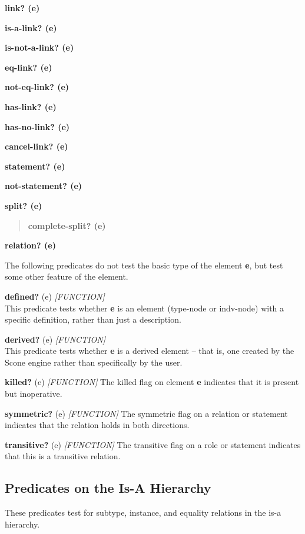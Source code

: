 \documentclass[titlepage,twoside,openright,11pt]{article}
\begin{document}
\textbf{link? (e)}

\textbf{is-a-link? (e)}

\textbf{is-not-a-link? (e)}

\textbf{eq-link? (e)}

\textbf{not-eq-link? (e)}

\textbf{has-link? (e)}

\textbf{has-no-link? (e)}

\textbf{cancel-link? (e)}

\textbf{statement? (e)}

\textbf{not-statement? (e)}

\textbf{split? (e)}

\begin{quote}
\textbf{complete-split? (e)}
\end{quote}

\textbf{relation? (e)}

The following predicates do not test the basic type of the element
\textbf{e}, but test some other feature of the element.

\textbf{defined?} (e) \emph{{[}FUNCTION{]}}\\
This predicate tests whether \textbf{e} is an element (type-node or
indv-node) with a specific definition, rather than just a description.

\textbf{derived?} (e) \emph{{[}FUNCTION{]}}\\
This predicate tests whether \textbf{e} is a derived element -- that is,
one created by the Scone engine rather than specifically by the user.

\textbf{killed?} (e) \emph{{[}FUNCTION{]}}\textbf{\hfill\break
}The killed flag on element \textbf{e} indicates that it is present but
inoperative.

\textbf{symmetric?} (e) \emph{{[}FUNCTION{]}}\textbf{\hfill\break
}The symmetric flag on a relation or statement indicates that the
relation holds in both directions.

\textbf{transitive?} (e) \emph{{[}FUNCTION{]}}\textbf{\hfill\break
}The transitive flag on a role or statement indicates that this is a
transitive relation.

\subsection{Predicates on the Is-A
Hierarchy}\label{predicates-on-the-is-a-hierarchy}

These predicates test for subtype, instance, and equality relations in
the is-a hierarchy.
\end{document}
